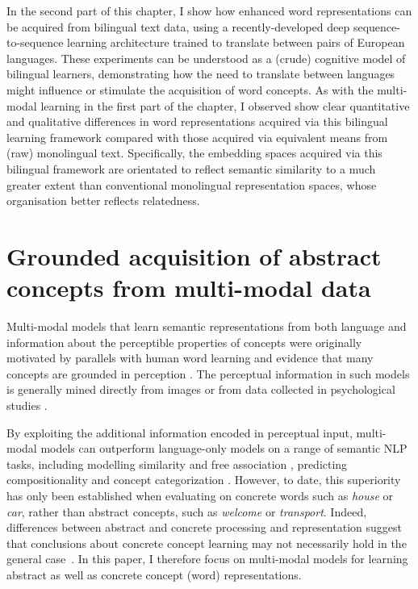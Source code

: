 In the second part of this chapter, I show how enhanced word representations can be acquired from bilingual text data, using a recently-developed deep sequence-to-sequence learning architecture trained to translate between pairs of European languages. These experiments can be understood as a (crude) cognitive model of bilingual learners, demonstrating how the need to translate between languages might influence or stimulate the acquisition of word concepts. As with the multi-modal learning in the first part of the chapter, I observed show clear quantitative and qualitative differences in word representations acquired via this bilingual learning framework compared with those acquired via equivalent means from (raw) monolingual text. Specifically, the embedding spaces acquired via this bilingual framework are orientated to reflect semantic similarity to a much greater extent than conventional monolingual representation spaces, whose organisation better reflects relatedness. 

\section{Grounded acquisition of abstract concepts from multi-modal data}

Multi-modal models that learn semantic representations from both language and information about the perceptible properties of concepts were originally motivated by parallels with human word learning \citep{andrews2009integrating} and evidence that many concepts are grounded in perception \citep{barsalou2005situating}. The perceptual information in such models is generally mined directly from images \citep{feng2010visual,bruni2012distributional} or from data collected in psychological studies \citep{silberer2012grounded,rollermultimodal}. 

By exploiting the additional information encoded in perceptual input, multi-modal models can outperform language-only models on a range of semantic NLP tasks, including modelling similarity \citep{bruni2014multimodal} and free association \citep{silberer2012grounded}, predicting compositionality \citep{rollermultimodal} and concept categorization \citep{silberer2014learning}. However, to date, this superiority has only been established when evaluating on concrete words such as \emph{house} or \emph{car}, rather than abstract concepts, such as \emph{welcome} or \emph{transport}. Indeed, differences between abstract and concrete processing and representation suggest that conclusions about concrete concept learning may not necessarily hold in the general case~\citep{paivio1991dual,hill2013quantitative}. In this paper, I therefore focus on multi-modal models for learning abstract as well as concrete concept (word) representations.

